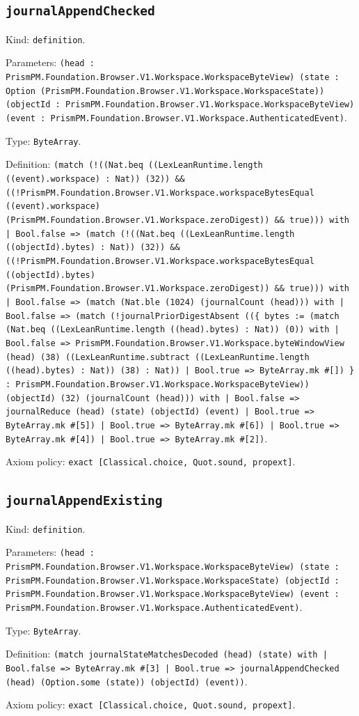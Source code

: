 \documentclass[11pt]{article}
\begin{document}
\subsection*{\texttt{journalAppendChecked}}
\noindent Kind: \texttt{definition}.\par
\noindent Parameters: \texttt{(head : PrismPM.Foundation.Browser.V1.Workspace.WorkspaceByteView) (state : Option (PrismPM.Foundation.Browser.V1.Workspace.WorkspaceState)) (objectId : PrismPM.Foundation.Browser.V1.Workspace.WorkspaceByteView) (event : PrismPM.Foundation.Browser.V1.Workspace.AuthenticatedEvent)}.\par
\noindent Type: \texttt{ByteArray}.\par
\noindent Definition: \texttt{(match (!((Nat.beq ((LexLeanRuntime.length ((event).workspace) : Nat)) (32)) \&\& ((!PrismPM.Foundation.Browser.V1.Workspace.workspaceBytesEqual ((event).workspace) (PrismPM.Foundation.Browser.V1.Workspace.zeroDigest)) \&\& true))) with | Bool.false => (match (!((Nat.beq ((LexLeanRuntime.length ((objectId).bytes) : Nat)) (32)) \&\& ((!PrismPM.Foundation.Browser.V1.Workspace.workspaceBytesEqual ((objectId).bytes) (PrismPM.Foundation.Browser.V1.Workspace.zeroDigest)) \&\& true))) with | Bool.false => (match (Nat.ble (1024) (journalCount (head))) with | Bool.false => (match (!journalPriorDigestAbsent ((\{ bytes := (match (Nat.beq ((LexLeanRuntime.length ((head).bytes) : Nat)) (0)) with | Bool.false => PrismPM.Foundation.Browser.V1.Workspace.byteWindowView (head) (38) ((LexLeanRuntime.subtract ((LexLeanRuntime.length ((head).bytes) : Nat)) (38) : Nat)) | Bool.true => ByteArray.mk \#[]) \} : PrismPM.Foundation.Browser.V1.Workspace.WorkspaceByteView)) (objectId) (32) (journalCount (head))) with | Bool.false => journalReduce (head) (state) (objectId) (event) | Bool.true => ByteArray.mk \#[5]) | Bool.true => ByteArray.mk \#[6]) | Bool.true => ByteArray.mk \#[4]) | Bool.true => ByteArray.mk \#[2])}.\par
\noindent Axiom policy: \texttt{exact [Classical.choice, Quot.sound, propext]}.\par
\subsection*{\texttt{journalAppendExisting}}
\noindent Kind: \texttt{definition}.\par
\noindent Parameters: \texttt{(head : PrismPM.Foundation.Browser.V1.Workspace.WorkspaceByteView) (state : PrismPM.Foundation.Browser.V1.Workspace.WorkspaceState) (objectId : PrismPM.Foundation.Browser.V1.Workspace.WorkspaceByteView) (event : PrismPM.Foundation.Browser.V1.Workspace.AuthenticatedEvent)}.\par
\noindent Type: \texttt{ByteArray}.\par
\noindent Definition: \texttt{(match journalStateMatchesDecoded (head) (state) with | Bool.false => ByteArray.mk \#[3] | Bool.true => journalAppendChecked (head) (Option.some (state)) (objectId) (event))}.\par
\noindent Axiom policy: \texttt{exact [Classical.choice, Quot.sound, propext]}.\par
\end{document}
